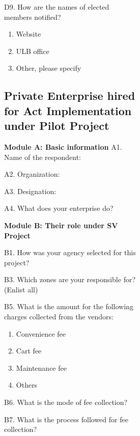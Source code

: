 \documentclass[a4paper, 12pt, twoside]{article}
\begin{document}
\begin{figure}
{\begin{figure}
\begin{figure}
\begin{mdframed}[backgroundcolor=gray!20]

D9. How are the names of elected members notified?
\begin{enumerate}[nosep]
\item Website
\item ULB office
\item Other, please specify
\end{enumerate}
\end{mdframed}

\begin{mdframed}[backgroundcolor=gray!20]
\subsection*{Private Enterprise hired for Act Implementation under Pilot Project}

\textbf{Module A: Basic information}
A1. Name of the respondent:

A2. Organization:

A3. Designation:

A4. What does your enterprise do?

\textbf{Module B: Their role under SV Project}

B1. How was your agency selected for this project?


B3. Which zones are your responsible for? (Enlist all)


B5. What is the amount for the following charges collected from the vendors:
\begin{enumerate}[nosep]
\item Convenience fee
\item Cart fee
\item Maintenance fee
\item Others
\end{enumerate}

B6.  What is the mode of fee collection?

B7. What is the process followed for fee collection?


\end{mdframed}
\end{figure}
\end{figure}}
\end{figure}
\end{document}
